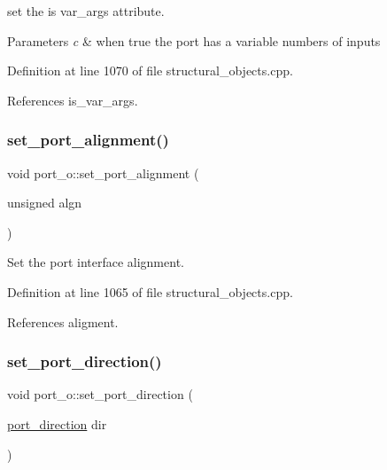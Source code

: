 set the is var\+\_\+args attribute. 


\begin{DoxyParams}{Parameters}
{\em c} & when true the port has a variable numbers of inputs \\
\hline
\end{DoxyParams}


Definition at line 1070 of file structural\+\_\+objects.\+cpp.



References is\+\_\+var\+\_\+args.

\mbox{\label{structport__o_a575f1ac38a4c1884b8e589080e135168}} 
\subsubsection{\texorpdfstring{set\+\_\+port\+\_\+alignment()}{set\_port\_alignment()}}
{\footnotesize\ttfamily void port\+\_\+o\+::set\+\_\+port\+\_\+alignment (\begin{DoxyParamCaption}\item[{unsigned}]{algn }\end{DoxyParamCaption})}



Set the port interface alignment. 



Definition at line 1065 of file structural\+\_\+objects.\+cpp.



References aligment.

\mbox{\label{structport__o_ad0168cc3891abada26f9ff2cd213563d}} 
\subsubsection{\texorpdfstring{set\+\_\+port\+\_\+direction()}{set\_port\_direction()}}
{\footnotesize\ttfamily void port\+\_\+o\+::set\+\_\+port\+\_\+direction (\begin{DoxyParamCaption}\item[{\hyperlink{structport__o_adb254df5665ff28b0769491cc3899fd5}{port\+\_\+direction}}]{dir }\end{DoxyParamCaption})}



